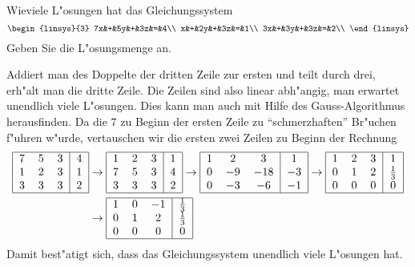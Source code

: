 Wieviele L"osungen hat das Gleichungssystem
\[
\begin{linsys}{3}
7x&+&5y&+&3z&=&4\\
x&+&2y&+&3z&=&1\\
3x&+&3y&+&3z&=&2\\
\end{linsys}
\]
Geben Sie die L"osungsmenge an.

\begin{loesung}
Addiert man des Doppelte der dritten Zeile zur ersten und teilt
durch drei, erh"alt man die dritte Zeile. Die Zeilen sind also
linear abh"angig, man erwartet
unendlich viele L"osungen. Dies kann man auch mit Hilfe des
Gauss-Algorithmus herausfinden. Da die $7$ zu Beginn der ersten
Zeile zu ``schmerzhaften'' Br"uchen f"uhren w"urde, vertauschen
wir die ersten zwei Zeilen zu Beginn der Rechnung
\begin{align*}
\begin{tabular}{|ccc|c|}
\hline
7&5&3&4\\
1&2&3&1\\
3&3&3&2\\
\hline
\end{tabular}
&\rightarrow
\begin{tabular}{|ccc|c|}
\hline
1&2&3&1\\
7&5&3&4\\
3&3&3&2\\
\hline
\end{tabular}
\rightarrow
\begin{tabular}{|ccc|c|}
\hline
1&2&3&1\\
0&$-9$&$-18$&$-3$\\
0&$-3$&$-6$&$-1$\\
\hline
\end{tabular}
\rightarrow
\begin{tabular}{|ccc|c|}
\hline
1&2&3&1\\
0&1&2&$\frac13$\\
0&0&0&0\\
\hline
\end{tabular}
\\
&\rightarrow
\begin{tabular}{|ccc|c|}
\hline
1&0&$-1$&$\frac13$\\
0&1&2&$\frac13$\\
0&0&0&0\\
\hline
\end{tabular}
\end{align*}
Damit best"atigt sich, dass das Gleichungssystem unendlich viele L"osungen
hat.

\end{loesung}
